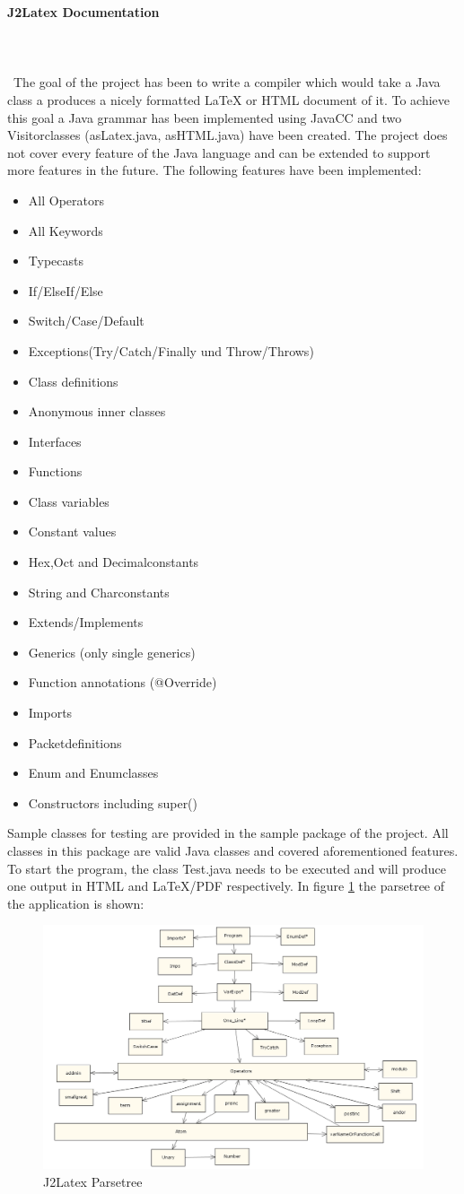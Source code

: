 \documentclass[10pt,a4paper,titlepage]{article}
\begin{document}
\textbf{\large J2Latex Documentation}\\\ \\\\\\\
The goal of the project has been to write a compiler which would take a Java class a produces a nicely formatted LaTeX or HTML document of it.
To achieve this goal a Java grammar has been implemented using JavaCC and two Visitorclasses (asLatex.java, asHTML.java) have been created. The project does not cover every feature of the Java language and can be extended to support more features in the future.
The following features have been implemented:\begin{itemize}
	\item All Operators
	\item All Keywords
	\item Typecasts
	\item If/ElseIf/Else
	\item Switch/Case/Default
	\item Exceptions(Try/Catch/Finally und Throw/Throws)
	\item Class definitions
	\item Anonymous inner classes
	\item Interfaces
	\item Functions
	\item Class variables
	\item Constant values
	\item Hex,Oct and Decimalconstants
	\item String and Charconstants
	\item Extends/Implements
	\item Generics (only single generics)
	\item Function annotations (@Override)
	\item Imports
	\item Packetdefinitions
	\item Enum and Enumclasses
	\item Constructors including super()
\end{itemize}
Sample classes for testing are provided in the sample package of the project. All classes in this package are valid Java classes and covered aforementioned features. To start the program, the class Test.java needs to be executed and will produce one output in HTML and LaTeX/PDF respectively. In figure \ref{j2latextree} the parsetree of the application is shown:
\begin{figure}
	\includegraphics[width=1.3\linewidth]{img/parsetree.png}
	\caption{J2Latex Parsetree}
	\label{j2latextree}
\end{figure}
\end{document}

